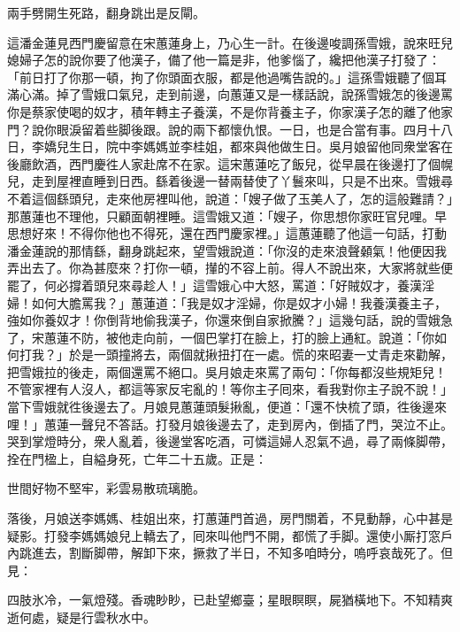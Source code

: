 \begin{myquote}
兩手劈開生死路，翻身跳出是反閘。
\end{myquote}

這潘金蓮見西門慶留意在宋蕙蓮身上，乃心生一計。在後邊唆調孫雪娥，說來旺兒媳婦子怎的說你要了他漢子，備了他一篇是非，他爹惱了，纔把他漢子打發了：「前日打了你那一頓，拘了你頭面衣服，都是他過嘴告說的。」這孫雪娥聽了個耳滿心滿。掉了雪娥口氣兒，走到前邊，向蕙蓮又是一樣話說，說孫雪娥怎的後邊罵你是蔡家使喝的奴才，積年轉主子養漢，不是你背養主子，你家漢子怎的離了他家門？說你眼淚留着些脚後跟。說的兩下都懷仇恨。一日，也是合當有事。四月十八日，李嬌兒生日，院中李媽媽並李桂姐，都來與他做生日。吳月娘留他同衆堂客在後廳飲酒，西門慶徃人家赴席不在家。這宋蕙蓮吃了飯兒，從早晨在後邊打了個幌兒，走到屋裡直睡到日西。繇着後邊一替兩替使了丫鬟來叫，只是不出來。雪娥尋不着這個繇頭兒，走來他房裡叫他，說道：「嫂子做了玉美人了，怎的這般難請？」那蕙蓮也不理他，只顧面朝裡睡。這雪娥又道：「嫂子，你思想你家旺官兒哩。早思想好來！不得你他也不得死，還在西門慶家裡。」{}這蕙蓮聽了他這一句話，打動潘金蓮說的那情繇，翻身跳起來，望雪娥說道：「你沒的走來浪聲顙氣！他便因我弄出去了。你為甚麼來？打你一頓，攆的不容上前。得人不說出來，大家將就些便罷了，何必撐着頭兒來尋趁人！」這雪娥心中大怒，罵道：「好賊奴才，養漢淫婦！如何大膽罵我？」蕙蓮道：「我是奴才淫婦，你是奴才小婦！我養漢養主子，強如你養奴才！{}你倒背地偷我漢子，你還來倒自家掀騰？」這幾句話，說的雪娥急了，宋蕙蓮不防，被他走向前，一個巴掌打在臉上，打的臉上通紅。說道：「你如何打我？」於是一頭撞將去，兩個就揪扭打在一處。慌的來昭妻一丈青走來勸解，把雪娥拉的後走，兩個還罵不絕口。吳月娘走來罵了兩句：「你每都沒些規矩兒！不管家裡有人沒人，都這等家反宅亂的！等你主子囘來，看我對你主子說不說！」當下雪娥就徃後邊去了。月娘見蕙蓮頭髮揪亂，便道：「還不快梳了頭，徃後邊來哩！」蕙蓮一聲兒不答話。打發月娘後邊去了，走到房內，倒插了門，哭泣不止。哭到掌燈時分，衆人亂着，後邊堂客吃酒，可憐這婦人忍氣不過，{}尋了兩條脚帶，拴在門楹上，自縊身死，亡年二十五歲。正是：

\begin{myquote}
世間好物不堅牢，彩雲易散琉璃脆。
\end{myquote}

落後，月娘送李媽媽、桂姐出來，打蕙蓮門首過，房門關着，不見動靜，心中甚是疑影。打發李媽媽娘兒上轎去了，囘來叫他門不開，都慌了手脚。還使小厮打窓戶內跳進去，割斷脚帶，解卸下來，撅救了半日，不知多咱時分，嗚呼哀哉死了。但見：

\begin{myquote}
四肢氷冷，一氣燈殘。香魂眇眇，已赴望鄉臺；星眼瞑瞑，屍猶橫地下。不知精爽逝何處，疑是行雲秋水中。
\end{myquote}

